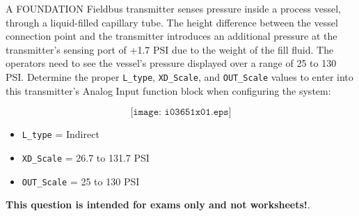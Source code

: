 

A FOUNDATION Fieldbus transmitter senses pressure inside a process vessel, through a liquid-filled capillary tube.  The height difference between the vessel connection point and the transmitter introduces an additional pressure at the transmitter's sensing port of +1.7 PSI due to the weight of the fill fluid.  The operators need to see the vessel's pressure displayed over a range of 25 to 130 PSI.  Determine the proper {\tt L\_type}, {\tt XD\_Scale}, and {\tt OUT\_Scale} values to enter into this transmitter's Analog Input function block when configuring the system:

$$\texttt{[image: i03651x01.eps]}$$







\begin{itemize}
\item{} {\tt L\_type} = Indirect
\item{} {\tt XD\_Scale} = 26.7 to 131.7 PSI 
\item{} {\tt OUT\_Scale} = 25 to 130 PSI
\end{itemize}







{\bf This question is intended for exams only and not worksheets!}.



